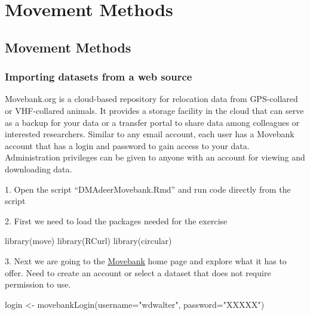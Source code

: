 \documentclass[
  letterpaper,
]{book}
\newenvironment{Shaded}{\begin{snugshade}}{\end{snugshade}}
\newcommand{\AttributeTok}[1]{\textcolor[rgb]{0.40,0.45,0.13}{#1}}
\newcommand{\FunctionTok}[1]{\textcolor[rgb]{0.28,0.35,0.67}{#1}}
\newcommand{\NormalTok}[1]{\textcolor[rgb]{0.00,0.23,0.31}{#1}}
\newcommand{\OtherTok}[1]{\textcolor[rgb]{0.00,0.23,0.31}{#1}}
\newcommand{\StringTok}[1]{\textcolor[rgb]{0.13,0.47,0.30}{#1}}
\begin{document}
\part{Movement Methods}

\hypertarget{movement-methods}{%
\chapter{Movement Methods}\label{movement-methods}}

\hypertarget{importing-datasets-from-a-web-source}{%
\section{Importing datasets from a web
source}\label{importing-datasets-from-a-web-source}}

Movebank.org is a cloud-based repository for relocation data from
GPS-collared or VHF-collared animals. It provides a storage facility in
the cloud that can serve as a backup for your data or a transfer portal
to share data among colleagues or interested researchers. Similar to any
email account, each user has a Movebank account that has a login and
password to gain access to your data. Administration privileges can be
given to anyone with an account for viewing and downloading data.

1. Open the script ``DMAdeerMovebank.Rmd'' and run code directly from
the script

2. First we need to load the packages needed for the exercise

\begin{Shaded}
\begin{Highlighting}[]
\FunctionTok{library}\NormalTok{(move)}
\FunctionTok{library}\NormalTok{(RCurl)}
\FunctionTok{library}\NormalTok{(circular)}
\end{Highlighting}
\end{Shaded}

3. Next we are going to the \href{https://www.movebank.org/}{Movebank}
home page and explore what it has to offer. Need to create an account or
select a dataset that does not require permission to use.

\begin{Shaded}
\begin{Highlighting}[]
\NormalTok{login }\OtherTok{\textless{}{-}} \FunctionTok{movebankLogin}\NormalTok{(}\AttributeTok{username=}\StringTok{"wdwalter"}\NormalTok{, }\AttributeTok{password=}\StringTok{"XXXXX"}\NormalTok{)}
\end{Highlighting}
\end{Shaded}
\end{document}
